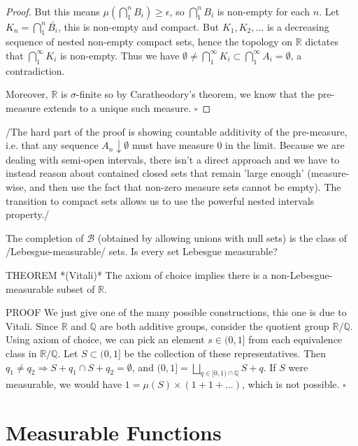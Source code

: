 \documentclass[9pt]{report}
\newlength{\tindent}
\newtheorem[L]{theorem}{Theorem}[chapter]
\newtheorem[L,nocut]{definition}[theorem]{Definition}
\newtheorem[S,nounderline]{remark}[theorem]{Remarks}
\newenvironment{Proof}{ 
	\\ \setlength{\parindent}{\tindent}
\begin{proof}}
{\end{proof} \setlength{\parindent}{0pt}}
\begin{document}
\begin{theorem}
\begin{Proof}
        But this means \(\mu(\bigcap_1^n B_i)\geq \epsilon\), so \(\bigcap_1^n B_i\) is non-empty for each \(n\). Let \(K_n = \bigcap_1^n \bar{B_i}\), this is non-empty and compact. But \(K_1,K_2,...\) is a decreasing sequence of nested non-empty compact sets, hence the topology on \(\mathbb{R}\) dictates that \(\bigcap_1^\infty K_i\) is non-empty. Thus we have \(\emptyset \neq \bigcap_1^\infty K_i \subset \bigcap_1^\infty A_i = \emptyset\), a contradiction.

    Moreover, \(\mathbb{R}\) is \(\sigma\)-finite so by Caratheodory's theorem, we know that the pre-measure extends to a unique such measure. \(\square\)
    \end{Proof}
    \end{theorem}
    
    /The hard part of the proof is showing countable additivity of the pre-measure, i.e. that any sequence \(A_n \downarrow \emptyset\) must have measure \(0\) in the limit. Because we are dealing with semi-open intervals, there isn't a direct approach and we have to instead reason about contained closed sets that remain 'large enough' (measure-wise, and then use the fact that non-zero measure sets cannot be empty). The transition to compact sets allows us to use the powerful nested intervals property./

The completion of \(\mathcal{B}\) (obtained by allowing unions with null sets) is the class of /Lebesgue-measurable/ sets. Is every set Lebesgue measurable? 

THEOREM *(Vitali)* The axiom of choice implies there is a non-Lebesgue-measurable subset of \(\mathbb{R}\). 

    PROOF We just give one of the many possible constructions, this one is due to Vitali. Since \(\mathbb{R}\) and \(\mathbb{Q}\) are both additive groups, consider the quotient group \(\mathbb{R}/\mathbb{Q}\). Using axiom of choice, we can pick an element \(s \in (0,1]\) from each equivalence class in \(\mathbb{R}/\mathbb{Q}\). Let \(S \subset (0,1]\) be the collection of these representatives. Then \(q_1 \neq q_2 \Rightarrow S+q_1 \cap S+q_2 = \emptyset\), and \((0,1] = \bigsqcup_{q\in [0,1)\cap\mathbb{Q}} S+q\). If \(S\) were measurable, we would have \(1 = \mu(S) \times (1+1+...) \), which is not possible. \(\square\) 

\chapter{Measurable Functions} 
\end{document}
